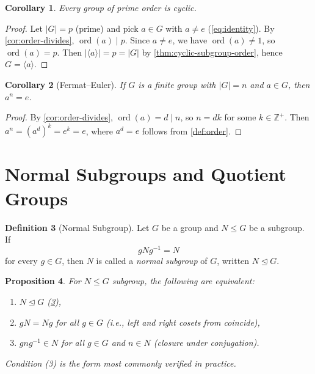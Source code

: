 \documentclass[12pt,a4paper]{article}
\theoremstyle{definition}
\newtheorem{definition}{Definition}[section]
\theoremstyle{plain}
\newtheorem{proposition}[definition]{Proposition}
\newtheorem{corollary}[definition]{Corollary}
\theoremstyle{remark}
\newcommand{\Z}{\mathbb{Z}}
\newcommand{\ord}{\operatorname{ord}}
\newcommand{\normal}{\trianglelefteq}
\begin{document}
\begin{corollary}\label{cor:prime-cyclic}
Every group of prime order is cyclic.
\end{corollary}

\begin{proof}
Let $|G| = p$ (prime) and pick $a \in G$ with $a \neq e$ (\cref{eq:identity}).
By \cref{cor:order-divides}, $\ord(a) \mid p$. Since $a \neq e$, we have
$\ord(a) \neq 1$, so $\ord(a) = p$.
Then $|\langle a \rangle| = p = |G|$ by \cref{thm:cyclic-subgroup-order},
hence $G = \langle a \rangle$.
\end{proof}

\begin{corollary}[Fermat--Euler]\label{cor:fermat-euler}
If $G$ is a finite group with $|G| = n$ and $a \in G$, then $a^n = e$.
\end{corollary}

\begin{proof}
By \cref{cor:order-divides}, $\ord(a) = d \mid n$, so $n = dk$ for some
$k \in \Z^+$. Then $a^n = (a^d)^k = e^k = e$, where $a^d = e$ follows from
\cref{def:order}.
\end{proof}


\section{Normal Subgroups and Quotient Groups}\label{sec:normal}

\begin{definition}[Normal Subgroup]\label{def:normal}
Let $G$ be a group and $N \leq G$ be a subgroup. If
\begin{equation}\label{eq:normal}
    gNg^{-1} = N
\end{equation}
for every $g \in G$, then $N$ is called a \emph{normal subgroup} of $G$,
written $N \normal G$.
\end{definition}

\begin{proposition}\label{prop:normal-equiv}
For $N \leq G$ subgroup, the following are equivalent:
\begin{enumerate}
    \item $N \normal G$ (\cref{def:normal}),
    \item $gN = Ng$ for all $g \in G$
          (i.e., left and right cosets from coincide),
    \item $gng^{-1} \in N$ for all $g \in G$ and $n \in N$
          (closure under conjugation).
\end{enumerate}
Condition (3) is the form most commonly verified in practice.
\end{proposition}
\end{document}
